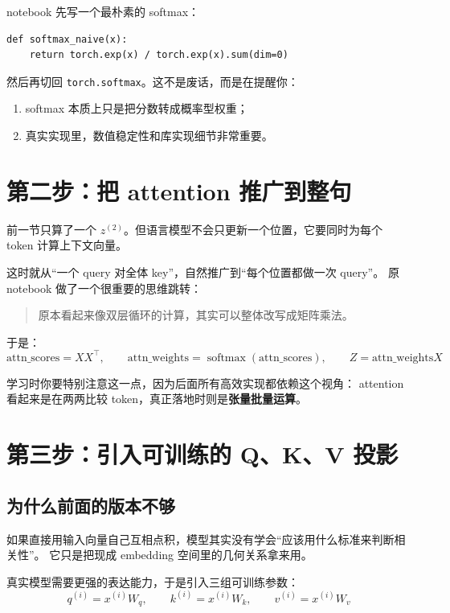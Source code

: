 \documentclass[12pt,a4paper]{ctexart}
\newcommand{\code}[1]{\texttt{#1}}
\begin{document}
notebook 先写一个最朴素的 softmax：

\begin{lstlisting}[style=py]
def softmax_naive(x):
    return torch.exp(x) / torch.exp(x).sum(dim=0)
\end{lstlisting}

然后再切回 \code{torch.softmax}。这不是废话，而是在提醒你：

\begin{enumerate}
  \item softmax 本质上只是把分数转成概率型权重；
  \item 真实实现里，数值稳定性和库实现细节非常重要。
\end{enumerate}

\section{第二步：把 attention 推广到整句}

前一节只算了一个 \(z^{(2)}\)。但语言模型不会只更新一个位置，它要同时为每个 token 计算上下文向量。

这时就从``一个 query 对全体 key''，自然推广到``每个位置都做一次 query''。
原 notebook 做了一个很重要的思维跳转：

\begin{quote}
原本看起来像双层循环的计算，其实可以整体改写成矩阵乘法。
\end{quote}

于是：
\[
\text{attn\_scores} = X X^\top, \qquad
\text{attn\_weights} = \operatorname{softmax}(\text{attn\_scores}), \qquad
Z = \text{attn\_weights} X
\]

学习时你要特别注意这一点，因为后面所有高效实现都依赖这个视角：
attention 看起来是在两两比较 token，真正落地时则是\textbf{张量批量运算}。

\section{第三步：引入可训练的 Q、K、V 投影}

\subsection{为什么前面的版本不够}

如果直接用输入向量自己互相点积，模型其实没有学会``应该用什么标准来判断相关性''。
它只是把现成 embedding 空间里的几何关系拿来用。

真实模型需要更强的表达能力，于是引入三组可训练参数：
\[
q^{(i)} = x^{(i)} W_q, \qquad
k^{(i)} = x^{(i)} W_k, \qquad
v^{(i)} = x^{(i)} W_v
\]
\end{document}
